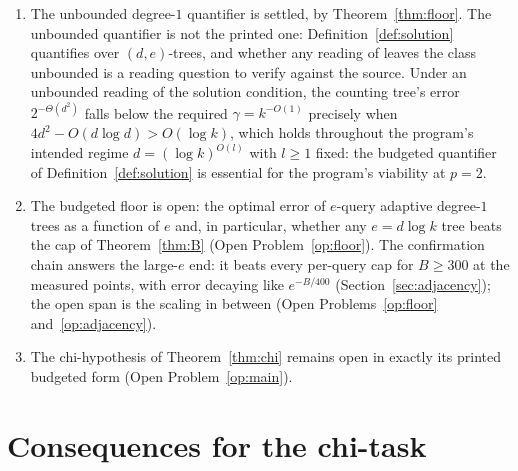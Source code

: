 \documentclass[11pt]{article}
\theoremstyle{definition}
\theoremstyle{remark}
\begin{document}
\begin{enumerate}
\item The unbounded degree-$1$ quantifier is settled, by
Theorem~\ref{thm:floor}.  The unbounded quantifier is not the printed
one: Definition~\ref{def:solution} quantifies over $(d,e)$-trees, and
whether any reading of \cite{Kra26} leaves the class unbounded is a
reading question to verify against the source.  Under an unbounded
reading of the solution condition, the counting tree's error
$2^{-\Theta(d^2)}$ falls below the required $\gamma=k^{-O(1)}$
precisely when $4d^2-O(d\log d)>O(\log k)$, which holds throughout the
program's intended regime $d=(\log k)^{O(l)}$ with $l\ge1$ fixed: the
budgeted quantifier of Definition~\ref{def:solution} is essential for
the program's viability at $p=2$.
\item The budgeted floor is open: the optimal error of $e$-query
adaptive degree-$1$ trees as a function of $e$ and, in particular,
whether any $e=d\log k$ tree beats the cap of Theorem~\ref{thm:B}
(Open Problem~\ref{op:floor}).  The confirmation chain answers the
large-$e$ end: it beats every per-query cap for $B\ge300$ at the
measured points, with error decaying like $e^{-B/400}$
(Section~\ref{sec:adjacency}); the open span is the scaling in
between (Open Problems~\ref{op:floor} and~\ref{op:adjacency}).
\item The chi-hypothesis of Theorem~\ref{thm:chi} remains open in
exactly its printed budgeted form (Open Problem~\ref{op:main}).
\end{enumerate}

\section{Consequences for the chi-task}\label{sec:consequences}
\end{document}
